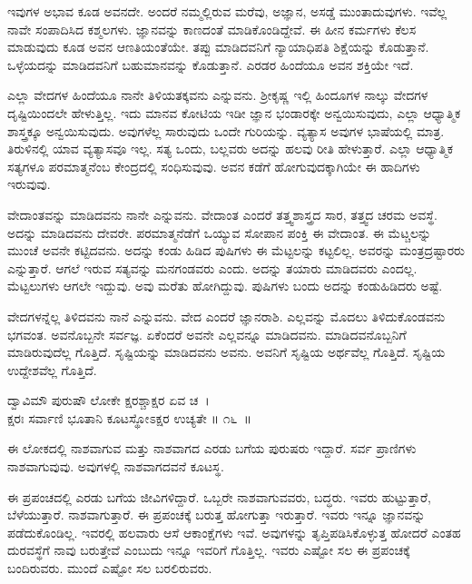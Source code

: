 ಇವುಗಳ ಅಭಾವ ಕೂಡ ಅವನದೇ. ಅಂದರೆ ನಮ್ಮಲ್ಲಿರುವ ಮರೆವು, ಅಜ್ಞಾನ, ಅಸಡ್ಡೆ ಮುಂತಾದುವುಗಳು. ಇವೆಲ್ಲ ನಾವೇ ಸಂಪಾದಿಸಿದ ಕಶ್ಮಲಗಳು. ಜ್ಞಾನವನ್ನು ಕಾಣದಂತೆ ಮಾಡಿಕೊಂಡಿದ್ದೇವೆ. ಈ ಹೀನ ಕರ್ಮಗಳು ಕೆಲಸ ಮಾಡುವುದು ಕೂಡ ಅವನ ಆಣತಿ\-ಯಂತೆಯೇ. ತಪ್ಪು ಮಾಡಿದವನಿಗೆ ನ್ಯಾಯಾಧಿಪತಿ ಶಿಕ್ಷೆಯನ್ನು ಕೊಡುತ್ತಾನೆ. ಒಳ್ಳೆಯದನ್ನು ಮಾಡಿದವನಿಗೆ ಬಹುಮಾನವನ್ನು ಕೊಡುತ್ತಾನೆ. ಎರಡರ ಹಿಂದೆಯೂ ಅವನ ಶಕ್ತಿಯೇ ಇದೆ.

ಎಲ್ಲಾ ವೇದಗಳ ಹಿಂದೆಯೂ ನಾನೇ ತಿಳಿಯತಕ್ಕವನು ಎನ್ನುವನು. ಶ‍್ರೀಕೃಷ್ಣ ಇಲ್ಲಿ ಹಿಂದೂಗಳ ನಾಲ್ಕು ವೇದಗಳ ದೃಷ್ಟಿಯಿಂದಲೇ ಹೇಳುತ್ತಿಲ್ಲ. ಇದು ಮಾನವ ಕೋಟಿಯ ಇಡೀ ಜ್ಞಾನ ಭಂಡಾರಕ್ಕೇ ಅನ್ವಯಿಸುವುದು, ಎಲ್ಲಾ ಆಧ್ಯಾತ್ಮಿಕ ಶಾಸ್ತ್ರಕ್ಕೂ ಅನ್ವಯಿಸುವುದು. ಅವುಗಳೆಲ್ಲ ಸಾರುವುದು ಒಂದೇ ಗುರಿಯನ್ನು. ವ್ಯತ್ಯಾಸ ಅವುಗಳ ಭಾಷೆಯಲ್ಲಿ ಮಾತ್ರ. ತಿರುಳಿನಲ್ಲಿ ಯಾವ ವ್ಯತ್ಯಾಸವೂ ಇಲ್ಲ. ಸತ್ಯ ಒಂದು, ಬಲ್ಲವರು ಅದನ್ನು ಹಲವು ರೀತಿ ಹೇಳುತ್ತಾರೆ. ಎಲ್ಲಾ ಆಧ್ಯಾತ್ಮಿಕ ಸತ್ಯಗಳೂ ಪರಮಾತ್ಮನೆಂಬ ಕೇಂದ್ರದಲ್ಲಿ ಸಂಧಿಸುವುವು. ಅವನ ಕಡೆಗೆ ಹೋಗುವುದಕ್ಕಾಗಿಯೇ ಈ ಹಾದಿಗಳು ಇರುವುವು.

ವೇದಾಂತವನ್ನು ಮಾಡಿದವನು ನಾನೇ ಎನ್ನುವನು. ವೇದಾಂತ ಎಂದರೆ ತತ್ತ್ವಶಾಸ್ತ್ರದ ಸಾರ, ತತ್ತ್ವದ ಚರಮ ಅವಸ್ಥೆ. ಅದನ್ನು ಮಾಡಿದವನು ದೇವರೇ. ಪರಮಾತ್ಮನೆಡೆಗೆ ಒಯ್ಯುವ ಸೋಪಾನ ಪಂಕ್ತಿ ಈ ವೇದಾಂತ. ಈ ಮೆಟ್ಚಲನ್ನು ಮುಂಚೆ ಅವನೇ ಕಟ್ಟಿದವನು. ಅದನ್ನು ಕಂಡು ಹಿಡಿದ ಪುಷಿಗಳು ಈ ಮೆಟ್ಟಲನ್ನು ಕಟ್ಟಲಿಲ್ಲ. ಅವರನ್ನು ಮಂತ್ರದ್ರಷ್ಟಾರರು ಎನ್ನುತ್ತಾರೆ. ಆಗಲೆ ಇರುವ ಸತ್ಯವನ್ನು ಮನಗಂಡವರು ಎಂದು. ಅದನ್ನು ತಯಾರು ಮಾಡಿದವರು ಎಂದಲ್ಲ. ಮೆಟ್ಟಲುಗಳು ಆಗಲೇ ಇದ್ದುವು. ಅವು ಮರೆತು ಹೋಗಿದ್ದುವು. ಪುಷಿಗಳು ಬಂದು ಅದನ್ನು ಕಂಡುಹಿಡಿದರು ಅಷ್ಟೆ.

ವೇದಗಳನ್ನೆಲ್ಲ ತಿಳಿದವನು ನಾನೆ ಎನ್ನುವನು. ವೇದ ಎಂದರೆ ಜ್ಞಾನರಾಶಿ. ಎಲ್ಲವನ್ನು ಮೊದಲು ತಿಳಿದುಕೊಂಡವನು ಭಗವಂತ. ಅವನೊಬ್ಬನೇ ಸರ್ವಜ್ಞ. ಏಕೆಂದರೆ ಅವನೇ ಎಲ್ಲವನ್ನೂ ಮಾಡಿದವನು. ಮಾಡಿದವನೊಬ್ಬನಿಗೆ ಮಾಡಿರುವುದೆಲ್ಲ ಗೊತ್ತಿದೆ. ಸೃಷ್ಟಿಯನ್ನು ಮಾಡಿದವನು ಅವನು. ಅವನಿಗೆ ಸೃಷ್ಟಿಯ ಅರ್ಥವೆಲ್ಲ ಗೊತ್ತಿದೆ. ಸೃಷ್ಟಿಯ ಉದ್ದೇಶವೆಲ್ಲ ಗೊತ್ತಿದೆ.

\begin{shloka}
ದ್ವಾವಿಮೌ ಪುರುಷೌ ಲೋಕೇ ಕ್ಷರಶ್ಚಾಕ್ಷರ ಏವ ಚ~।\\ಕ್ಷರಃ ಸರ್ವಾಣಿ ಭೂತಾನಿ ಕೂಟಸ್ಥೋಽಕ್ಷರ ಉಚ್ಯತೇ \hfill॥ ೧೬~॥
\end{shloka}

\begin{artha}
ಈ ಲೋಕದಲ್ಲಿ ನಾಶವಾಗುವ ಮತ್ತು ನಾಶವಾಗದ ಎರಡು ಬಗೆಯ ಪುರುಷರು ಇದ್ದಾರೆ. ಸರ್ವ ಪ್ರಾಣಿಗಳು ನಾಶವಾಗುವುವು. ಅವುಗಳಲ್ಲಿ ನಾಶವಾಗದವನೆ ಕೂಟಸ್ಥ.
\end{artha}

ಈ ಪ್ರಪಂಚದಲ್ಲಿ ಎರಡು ಬಗೆಯ ಜೀವಿಗಳಿದ್ದಾರೆ. ಒಬ್ಬರೇ ನಾಶವಾಗುವವರು, ಬದ್ಧರು. ಇವರು ಹುಟ್ಟುತ್ತಾರೆ, ಬೆಳೆಯುತ್ತಾರೆ. ನಾಶವಾಗುತ್ತಾರೆ. ಈ ಪ್ರಪಂಚಕ್ಕೆ ಬರುತ್ತ ಹೋಗುತ್ತಾ ಇರುತ್ತಾರೆ. ಇವರು ಇನ್ನೂ ಜ್ಞಾನವನ್ನು ಪಡೆದುಕೊಂಡಿಲ್ಲ. ಇವರಲ್ಲಿ ಹಲವಾರು ಆಸೆ ಆಕಾಂಕ್ಷೆಗಳು ಇವೆ. ಅವುಗಳನ್ನು ತೃಪ್ತಿಪಡಿಸಿಕೊಳ್ಳುತ್ತ ಹೋದರೆ ಎಂತಹ ದುರವಸ್ಥೆಗೆ ನಾವು ಬರುತ್ತೇವೆ ಎಂಬುದು ಇನ್ನೂ ಇವರಿಗೆ ಗೊತ್ತಿಲ್ಲ. ಇವರು ಎಷ್ಟೋ ಸಲ ಈ ಪ್ರಪಂಚಕ್ಕೆ ಬಂದಿರುವರು. ಮುಂದೆ ಎಷ್ಟೋ ಸಲ ಬರಲಿರುವರು.

